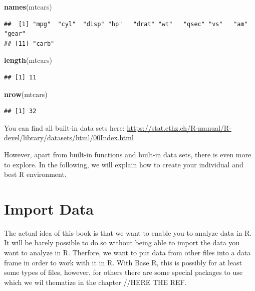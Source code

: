 \documentclass[]{report}
\newenvironment{Shaded}{\begin{snugshade}}{\end{snugshade}}
\newcommand{\KeywordTok}[1]{\textcolor[rgb]{0.13,0.29,0.53}{\textbf{#1}}}
\newcommand{\NormalTok}[1]{#1}
\begin{document}
\begin{Shaded}
\begin{Highlighting}[]
\KeywordTok{names}\NormalTok{(mtcars) }
\end{Highlighting}
\end{Shaded}

\begin{verbatim}
##  [1] "mpg"  "cyl"  "disp" "hp"   "drat" "wt"   "qsec" "vs"   "am"   "gear"
## [11] "carb"
\end{verbatim}

\begin{Shaded}
\begin{Highlighting}[]
\KeywordTok{length}\NormalTok{(mtcars)}
\end{Highlighting}
\end{Shaded}

\begin{verbatim}
## [1] 11
\end{verbatim}

\begin{Shaded}
\begin{Highlighting}[]
\KeywordTok{nrow}\NormalTok{(mtcars)}
\end{Highlighting}
\end{Shaded}

\begin{verbatim}
## [1] 32
\end{verbatim}

You can find all built-in data sets here:
\url{https://stat.ethz.ch/R-manual/R-devel/library/datasets/html/00Index.html}

However, apart from built-in functions and built-in data sets, there is
even more to explore. In the following, we will explain how to create
your individual and best R environment.

\section{Import Data}\label{import-data}

The actual idea of this book is that we want to enable you to analyze
data in R. It will be barely possible to do so without being able to
import the data you want to analyze in R. Therfore, we want to put data
from other files into a data frame in order to work with it in R. With
Base R, this is possibly for at least some types of files, however, for
others there are some special packages to use which we wil thematize in
the chapter //HERE THE REF.
\end{document}
